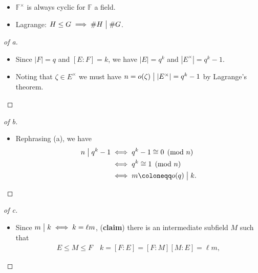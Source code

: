 
\begin{concept}

\envlist

\begin{itemize}
\tightlist
\item
  \({\mathbb{F}}^{\times}\) is always cyclic for \({\mathbb{F}}\) a
  field.
\item
  Lagrange: \(H\leq G \implies \#H \bigm|\# G\).
\end{itemize}

\end{concept}

\begin{solution}

\envlist

\begin{proof}[of a]

\envlist

\begin{itemize}
\item
  Since \({\left\lvert {F} \right\rvert} = q\) and \([E:F] = k\), we
  have \({\left\lvert {E} \right\rvert} = q^k\) and
  \({\left\lvert {E^{\times}} \right\rvert} = q^k-1\).
\item
  Noting that \(\zeta \in E^{\times}\) we must have
  \(n = o(\zeta) \bigm|{\left\lvert {E^{\times}} \right\rvert} = q^k-1\)
  by Lagrange's theorem.
\end{itemize}

\end{proof}

\begin{proof}[of b]

\envlist

\begin{itemize}
\tightlist
\item
  Rephrasing (a), we have
  \begin{align*}
  n \bigm|q^k-1 
  &\iff q^k-1 \cong 0 \pmod n \\
  &\iff q^k \cong 1 \pmod n \\
  &\iff m \coloneqq o(q) \bigm|k
  .\end{align*}
\end{itemize}

\end{proof}

\begin{proof}[of c]

\envlist

\begin{itemize}
\item
  Since \(m\bigm|k \iff k = \ell m\), (\textbf{claim}) there is an
  intermediate subfield \(M\) such that
  \begin{align*}
  E \leq M \leq F \quad k = [F:E] = [F:M] [M:E] = \ell m
  ,\end{align*}


\end{itemize}
\end{proof}
\end{solution}
